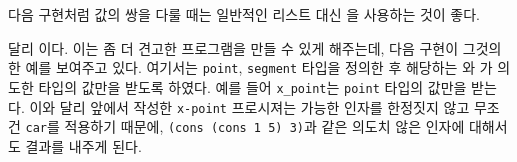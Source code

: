 






다음 구현처럼  값의 쌍을 다룰 때는 일반적인 리스트 대신
을 사용하는 것이 좋다.



 달리   이다. 이는 좀 더 견고한 프로그램을 만들 수 있게 해주는데, 다음
구현이 그것의 한 예를 보여주고 있다. 여기서는 \texttt{point}, \texttt{segment}
타입을 정의한 후 해당하는 와
가 의도한 타입의 값만을 받도록 하였다. 예를 들어
\texttt{x\_point}는 \texttt{point} 타입의 값만을 받는다. 이와 달리
앞에서  작성한 \texttt{x-point} 프로시져는 가능한 인자를 한정짓지
않고 무조건 \texttt{car}를 적용하기 때문에, \texttt{(cons (cons 1 5) 3)}과
같은 의도치 않은 인자에 대해서도 결과를 내주게 된다.






